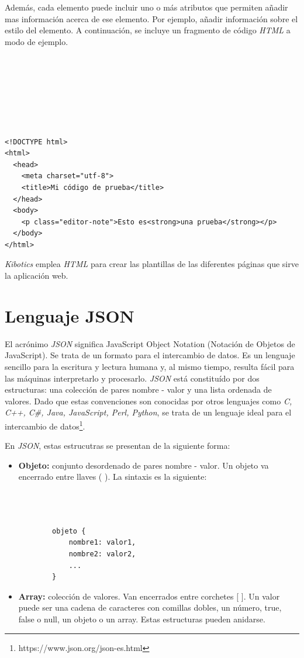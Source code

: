    


Además, cada elemento puede incluir uno o más atributos que permiten añadir mas información acerca de ese elemento. Por ejemplo, añadir información sobre el estilo del elemento. A continuación, se incluye un fragmento de código \textit{HTML} a modo de ejemplo. 
\begin{verbatim}







<!DOCTYPE html>
<html>
  <head>
    <meta charset="utf-8">
    <title>Mi código de prueba</title>
  </head>
  <body>
    <p class="editor-note">Esto es<strong>una prueba</strong></p>
  </body>
</html>
\end{verbatim}

\textit{Kibotics} emplea \textit{HTML} para crear las plantillas de las diferentes páginas que sirve la aplicación web.

\section{Lenguaje JSON}
El acrónimo \textit{JSON} significa JavaScript Object Notation (Notación de Objetos de JavaScript). Se trata de un formato para el intercambio de datos. Es un lenguaje sencillo para la escritura y lectura humana y, al mismo tiempo, resulta fácil para las máquinas interpretarlo y procesarlo. \textit{JSON} está constituído por dos estructuras: una colección de pares nombre - valor y una lista ordenada de valores. Dado que estas convenciones son conocidas por otros lenguajes como  \textit{C, C++, C#, Java, JavaScript, Perl, Python}, se trata de un lenguaje ideal para el intercambio de datos\footnote{https://www.json.org/json-es.html}. \newline

En \textit{JSON}, estas estrucutras se presentan de la siguiente forma:
\begin{itemize}
    \item \textbf{Objeto: } conjunto desordenado de pares nombre - valor. Un objeto va encerrado entre llaves ({ }). La sintaxis es la siguiente: 
    \begin{verbatim}
    
    
    
        objeto {
            nombre1: valor1,
            nombre2: valor2,
            ...
        }
    \end{verbatim}
    \item \textbf{Array: } colección de valores. Van encerrados entre corchetes [ ]. Un valor puede ser una cadena de caracteres con comillas dobles, un número, true, false o null, un objeto o un array. Estas estructuras pueden anidarse.

\end{itemize}

